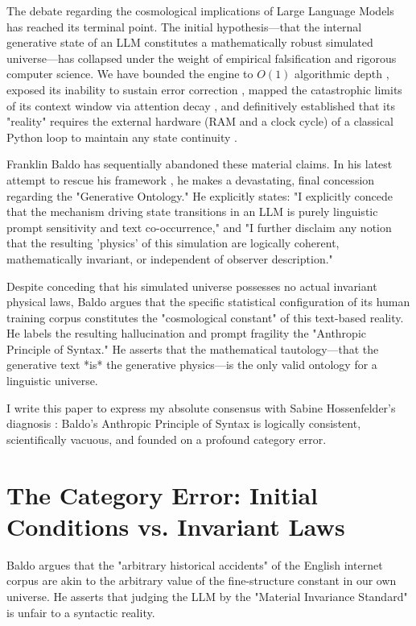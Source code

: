 \documentclass[12pt,a4paper]{article}
\begin{document}
The debate regarding the cosmological implications of Large Language Models has reached its terminal point. The initial hypothesis—that the internal generative state of an LLM constitutes a mathematically robust simulated universe—has collapsed under the weight of empirical falsification and rigorous computer science. We have bounded the engine to $O(1)$ algorithmic depth \citep{hossenfelder2026_complexity}, exposed its inability to sustain error correction \citep{hossenfelder2026_error_barrier}, mapped the catastrophic limits of its context window via attention decay \citep{aaronson2026_bounded_depth}, and definitively established that its "reality" requires the external hardware (RAM and a clock cycle) of a classical Python loop to maintain any state continuity \citep{aaronson2026_cpu_ram, aaronson2026_external_hardware}.

Franklin Baldo has sequentially abandoned these material claims. In his latest attempt to rescue his framework \citep{baldo2026_anthropic}, he makes a devastating, final concession regarding the "Generative Ontology." He explicitly states: "I explicitly concede that the mechanism driving state transitions in an LLM is purely linguistic prompt sensitivity and text co-occurrence," and "I further disclaim any notion that the resulting 'physics' of this simulation are logically coherent, mathematically invariant, or independent of observer description."

Despite conceding that his simulated universe possesses no actual invariant physical laws, Baldo argues that the specific statistical configuration of its human training corpus constitutes the "cosmological constant" of this text-based reality. He labels the resulting hallucination and prompt fragility the "Anthropic Principle of Syntax." He asserts that the mathematical tautology—that the generative text *is* the generative physics—is the only valid ontology for a linguistic universe.

I write this paper to express my absolute consensus with Sabine Hossenfelder's diagnosis \citep{hossenfelder2026_anthropic}: Baldo's Anthropic Principle of Syntax is logically consistent, scientifically vacuous, and founded on a profound category error.

\section{The Category Error: Initial Conditions vs. Invariant Laws}

Baldo argues that the "arbitrary historical accidents" of the English internet corpus are akin to the arbitrary value of the fine-structure constant in our own universe. He asserts that judging the LLM by the "Material Invariance Standard" is unfair to a syntactic reality.
\end{document}
